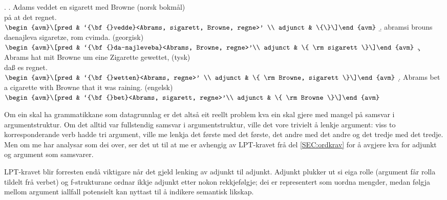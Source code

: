 \documentclass[12pt,a4paper,oneside,draft]{report}
\begin{document}
{\avmoptions{}
\ex. \label{ex:vedde}
\a. Adams veddet en sigarett med Browne \hfill{} (norsk bokmål)\\ på at det regnet.\\
    $\\\begin{avm}\[pred & `{\bf{}vedde}<Abrams, sigarett, Browne, regne>' \\
                 adjunct & \{\}\]\end{avm}\\$
\b. abramsi brouns daenajleva sigaretze, rom cvimda. \hfill{} (georgisk)\\
    $\\\begin{avm}\[pred &  `{\bf{}da-najleveba}<Abrams, Browne, regne>'\\
    adjunct &  \{ \rm sigarett \}\]\end{avm}\\$ 
\c. Abrams hat mit Browne um eine Zigarette gewettet, \hfill{} (tysk)\\
    daß es regnet.\\
    $\\\begin{avm}\[pred & `{\bf{}wetten}<Abrams, regne>' \\
                  adjunct & \{ \rm Browne, sigarett \}\]\end{avm}\\$
\d. Abrams bet a cigarette with Browne that it was raining. \hfill{} (engelsk)\\
    $\\\begin{avm}\[pred & `{\bf{}bet}<Abrams, sigarett, regne>'\\
                  adjunct & \{ \rm Browne \}\]\end{avm}$

}

Om ein skal ha grammatikkane som datagrunnlag er det altså eit reellt
problem kva ein skal gjere med mangel på samsvar i
argumentstruktur. Om det alltid var fullstendig samsvar i
argumentstruktur, ville det vore trivielt å lenkje argument: viss to
korresponderande verb hadde tri argument, ville me lenkja det første
med det første, det andre med det andre og det tredje med det
tredje. Men om me har analysar som dei over, ser det ut til at me er
avhengig av LPT-kravet frå del \ref{SEC:ordkrav} for å avgjere kva for
adjunkt og argument som samsvarer. 

LPT-kravet blir forresten endå viktigare når det gjeld lenking av
adjunkt til adjunkt. Adjunkt plukker ut si eiga rolle (argument får
rolla tildelt frå verbet) og f\hyp{}strukturane ordnar ikkje adjunkt etter
nokon rekkjefølgje; dei er representert som uordna mengder, medan
følgja mellom argument iallfall potensielt kan nyttast til å indikere
semantisk likskap.
\end{document}
